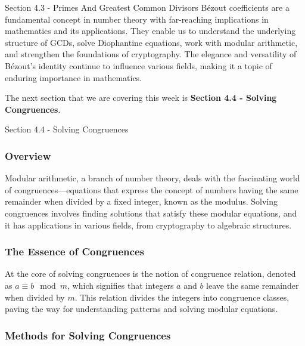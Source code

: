 \begin{notes}{Section 4.3 - Primes And Greatest Common Divisors}
    Bézout coefficients are a fundamental concept in number theory with far-reaching implications in mathematics and its applications. They enable us to understand the underlying structure of GCDs, 
    solve Diophantine equations, work with modular arithmetic, and strengthen the foundations of cryptography. The elegance and versatility of Bézout's identity continue to influence various fields, 
    making it a topic of enduring importance in mathematics.
\end{notes}

The next section that we are covering this week is \textbf{Section 4.4 - Solving Congruences}.

\begin{notes}{Section 4.4 - Solving Congruences}
    \subsubsection*{Overview}

    Modular arithmetic, a branch of number theory, deals with the fascinating world of congruences—equations that express the concept of numbers having the same remainder when divided by a fixed integer, 
    known as the modulus. Solving congruences involves finding solutions that satisfy these modular equations, and it has applications in various fields, from cryptography to algebraic structures.

    \subsubsection*{The Essence of Congruences}

    At the core of solving congruences is the notion of congruence relation, denoted as \(a \equiv b \mod m\), which signifies that integers \(a\) and \(b\) leave the same remainder when divided by 
    \(m\). This relation divides the integers into congruence classes, paving the way for understanding patterns and solving modular equations.

    \subsubsection*{Methods for Solving Congruences}


\end{notes}
